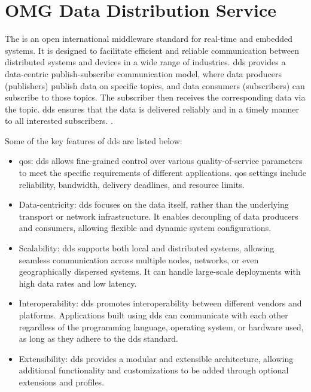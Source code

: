 \section{OMG Data Distribution Service}\label{c3_sec_dds}
The  is an open international middleware standard for real-time and embedded systems\cite{noauthor_data_nodate}. It is designed to facilitate efficient and reliable communication between distributed systems and devices in a wide range of industries.\newline 
\gls{dds} provides a data-centric publish-subscribe communication model, where data producers (publishers) publish data on specific topics, and data consumers (subscribers) can subscribe to those topics. The subscriber then receives the corresponding data via the topic. \gls{dds} ensures that the data is delivered reliably and in a timely manner to all interested subscribers. \cite{pardo-castellote_omg_2003, schlesselman_omg_2004}.

Some of the key features of \gls{dds} are listed below:
\begin{itemize}
    \item \gls{qos}: \gls{dds} allows fine-grained control over various quality-of-service parameters to meet the specific requirements of different applications. \gls{qos} settings include reliability, bandwidth, delivery deadlines, and resource limits.

    \item Data-centricity: \gls{dds} focuses on the data itself, rather than the underlying transport or network infrastructure. It enables decoupling of data producers and consumers, allowing flexible and dynamic system configurations.

    \item Scalability: \gls{dds} supports both local and distributed systems, allowing seamless communication across multiple nodes, networks, or even geographically dispersed systems. It can handle large-scale deployments with high data rates and low latency.

    \item Interoperability: \gls{dds} promotes interoperability between different vendors and platforms. Applications built using \gls{dds} can communicate with each other regardless of the programming language, operating system, or hardware used, as long as they adhere to the \gls{dds} standard.

    \item Extensibility: \gls{dds} provides a modular and extensible architecture, allowing additional functionality and customizations to be added through optional extensions and profiles.

\end{itemize}
